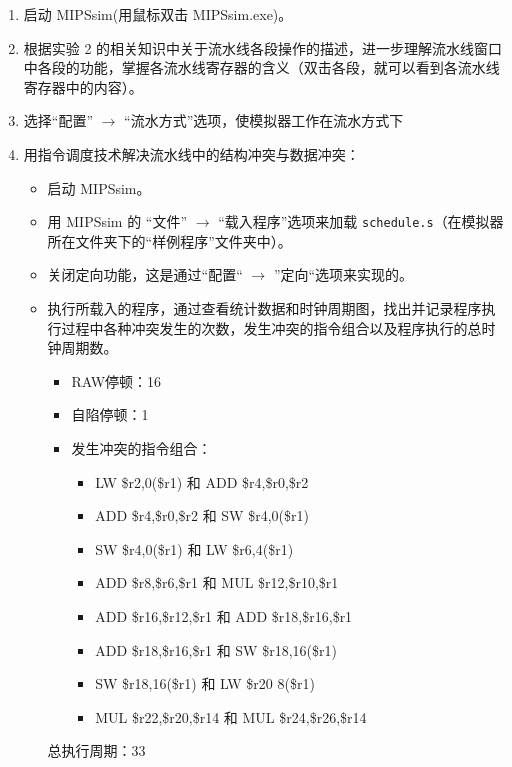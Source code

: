 \documentclass[blue,normal,cn]{elegantnote}
\newcommand{\code}[1]{\colorbox{light-gray}{\texttt{#1}}}
\begin{document}
\begin{enumerate}[wide=0pt, listparindent=2em, parsep=0pt]
    \item 启动 MIPSsim(用鼠标双击 MIPSsim.exe)。
    \item 根据实验 2 的相关知识中关于流水线各段操作的描述，进一步理解流水线窗口中各段的功能，掌握各流水线寄存器的含义（双击各段，就可以看到各流水线寄存器中的内容）。
    \item 选择“配置” $\rightarrow$ “流水方式”选项，使模拟器工作在流水方式下
    \item 用指令调度技术解决流水线中的结构冲突与数据冲突：

          \begin{itemize}[leftmargin=3em, listparindent=2em, parsep=0pt]
              \item 启动 MIPSsim。
              \item 用 MIPSsim 的 “文件” $\rightarrow$ “载入程序”选项来加载 \code{schedule.s}（在模拟器所在文件夹下的“样例程序”文件夹中）。
              \item 关闭定向功能，这是通过“配置“ $\rightarrow$ ”定向“选项来实现的。
              \item  执行所载入的程序，通过查看统计数据和时钟周期图，找出并记录程序执行过程中各种冲突发生的次数，发生冲突的指令组合以及程序执行的总时钟周期数。

                    \textcolor{ans}{
                        \begin{itemize}[leftmargin=3em, listparindent=2em, parsep=0pt]
                            \item RAW停顿：16
                            \item 自陷停顿：1
                            \item 发生冲突的指令组合：
                                  \begin{itemize}[leftmargin=3em]
                                      \item LW \$r2,0(\$r1) 和 ADD \$r4,\$r0,\$r2
                                      \item ADD \$r4,\$r0,\$r2 和 SW \$r4,0(\$r1)
                                      \item SW \$r4,0(\$r1) 和 LW \$r6,4(\$r1)
                                      \item ADD \$r8,\$r6,\$r1 和 MUL \$r12,\$r10,\$r1
                                      \item ADD \$r16,\$r12,\$r1 和 ADD \$r18,\$r16,\$r1
                                      \item ADD \$r18,\$r16,\$r1 和 SW \$r18,16(\$r1)
                                      \item SW \$r18,16(\$r1) 和 LW \$r20 8(\$r1)
                                      \item MUL \$r22,\$r20,\$r14 和 MUL \$r24,\$r26,\$r14
                                  \end{itemize}
                        \end{itemize}
                    }
                    \textcolor{ans}{总执行周期：33}


\end{itemize}
\end{enumerate}
\end{document}
